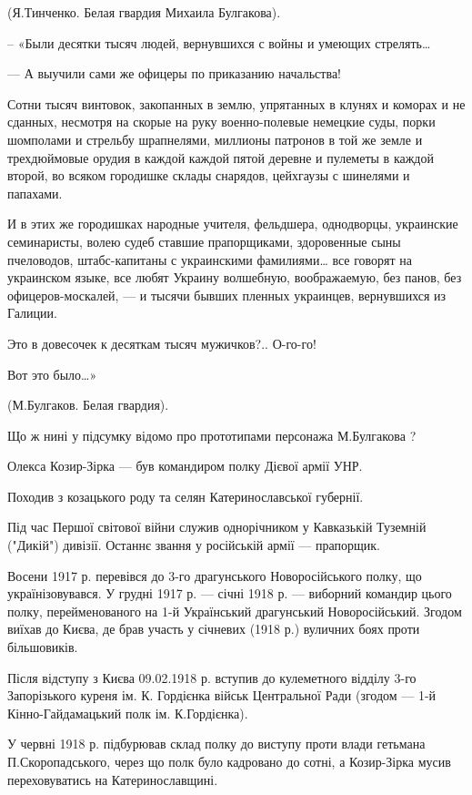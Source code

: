 (Я.Тинченко. Белая гвардия Михаила Булгакова).

– «Были десятки тысяч людей, вернувшихся с войны и умеющих стрелять…

— А выучили сами же офицеры по приказанию начальства!

Сотни тысяч винтовок, закопанных в землю, упрятанных в клунях и коморах и не
сданных, несмотря на скорые на руку военно-полевые немецкие суды, порки
шомполами и стрельбу шрапнелями, миллионы патронов в той же земле и
трехдюймовые орудия в каждой каждой пятой деревне и пулеметы в каждой второй,
во всяком городишке склады снарядов, цейхгаузы с шинелями и папахами.

И в этих же городишках народные учителя, фельдшера, однодворцы, украинские
семинаристы, волею судеб ставшие прапорщиками, здоровенные сыны пчеловодов,
штабс-капитаны с украинскими фамилиями… все говорят на украинском языке, все
любят Украину волшебную, воображаемую, без панов, без офицеров-москалей, — и
тысячи бывших пленных украинцев, вернувшихся из Галиции.

Это в довесочек к десяткам тысяч мужичков?.. О-го-го!

Вот это было…»

(М.Булгаков. Белая гвардия).

Що ж нині у підсумку відомо про прототипами персонажа М.Булгакова ?

Олекса Козир-Зірка — був командиром полку Дієвої армії УНР.

Походив з козацького роду та селян Катеринославської губернії. 

Під час Першої світової війни служив однорічником у Кавказькій Туземній
("Дикій") дивізії. Останнє звання у російській армії — прапорщик.

Восени 1917 р. перевівся до 3-го драгунського Новоросійського полку, що
українізовувався. У грудні 1917 р. — січні 1918 р. — виборний командир цього
полку, перейменованого на 1-й Український драгунський Новоросійський. Згодом
виїхав до Києва, де брав участь у січневих (1918 р.) вуличних боях проти
більшовиків. 

Після відступу з Києва 09.02.1918 р. вступив до кулеметного відділу 3-го
Запорізького куреня ім. К. Гордієнка військ Центральної Ради (згодом — 1-й
Кінно-Гайдамацький полк ім. К.Гордієнка). 

У червні 1918 р. підбурював склад полку до виступу проти влади гетьмана
П.Скоропадського, через що полк було кадровано до сотні, а Козир-Зірка мусив
переховуватись на Катеринославщині. 

